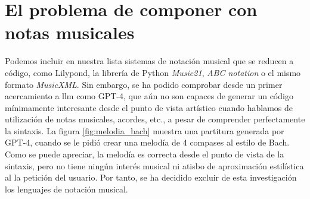     
\section{El problema de componer con notas musicales}

Podemos incluir en nuestra lista sistemas de notación musical que se reducen a código, como Lilypond, la librería de {Python} \emph{Music21}, \emph{ABC notation} o el mismo formato \emph{MusicXML}. Sin embargo, se ha podido comprobar desde un primer acercamiento a \gls{llm} como GPT-4, que aún no son capaces de generar un código mínimamente interesante desde el punto de vista artístico cuando hablamos de utilización de notas musicales, acordes, etc., a pesar de comprender perfectamente la sintaxis. La figura \ref{fig:melodia_bach} muestra una partitura generada por GPT-4, cuando se le pidió crear una melodía de 4 compases al estilo de Bach. Como se puede apreciar, la melodía es correcta desde el punto de vista de la sintaxis, pero no tiene ningún interés musical ni atisbo de aproximación estilística al la petición del usuario. Por tanto, se ha decidido excluir de esta investigación los lenguajes de notación musical.

